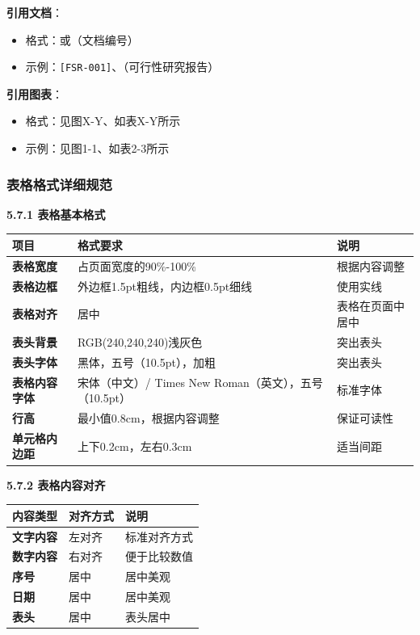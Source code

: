 \documentclass[12pt,a4paper]{article}
\numberwithin{equation}{section}  %
\begin{document}
\textbf{引用文档}：
\begin{itemize}
\item 格式：{\ttfamily [文档编号]}或{\ttfamily （文档编号）}
\item 示例：\texttt{[FSR-001]}、{\ttfamily （可行性研究报告）}
\end{itemize}

\textbf{引用图表}：
\begin{itemize}
\item 格式：{\ttfamily 见图X-Y}、{\ttfamily 如表X-Y所示}
\item 示例：{\ttfamily 见图1-1}、{\ttfamily 如表2-3所示}
\end{itemize}

\subsubsection{表格格式详细规范}
\textbf{5.7.1 表格基本格式}

\begin{longtable}{|p{4cm}|p{5cm}|p{5cm}|}
\hline
项目 & 格式要求 & 说明 \\
\hline
\textbf{表格宽度} & 占页面宽度的90\%-100\% & 根据内容调整 \\
\textbf{表格边框} & 外边框1.5pt粗线，内边框0.5pt细线 & 使用实线 \\
\textbf{表格对齐} & 居中 & 表格在页面中居中 \\
\textbf{表头背景} & RGB(240,240,240)浅灰色 & 突出表头 \\
\textbf{表头字体} & 黑体，五号（10.5pt），加粗 & 突出表头 \\
\textbf{表格内容字体} & 宋体（中文）/ Times New Roman（英文），五号（10.5pt） & 标准字体 \\
\textbf{行高} & 最小值0.8cm，根据内容调整 & 保证可读性 \\
\textbf{单元格内边距} & 上下0.2cm，左右0.3cm & 适当间距 \\
\hline
\end{longtable}

\textbf{5.7.2 表格内容对齐}

\begin{longtable}{|p{4cm}|p{5cm}|p{5cm}|}
\hline
内容类型 & 对齐方式 & 说明 \\
\hline
\textbf{文字内容} & 左对齐 & 标准对齐方式 \\
\textbf{数字内容} & 右对齐 & 便于比较数值 \\
\textbf{序号} & 居中 & 居中美观 \\
\textbf{日期} & 居中 & 居中美观 \\
\textbf{表头} & 居中 & 表头居中 \\
\hline
\end{longtable}
\end{document}
